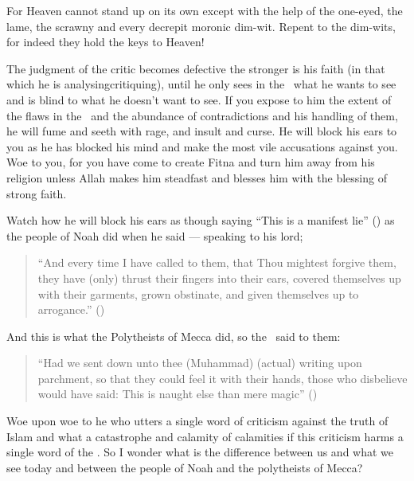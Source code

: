 \documentclass[12pt]{memoir}
\begin{document}
For Heaven cannot stand up on its own except with the help of the one-eyed,
the lame, the scrawny and every decrepit moronic dim-wit.
Repent to the dim-wits, for indeed they hold the keys to Heaven!

The judgment of the critic becomes defective the stronger is his faith
(in that which he is analysing\/critiquing),
until he only sees in the \Quran\ what he wants to see
and is blind to what he doesn’t want to see.
If you expose to him the extent of the flaws in the \Quran\
and the abundance of contradictions and his handling of them,
he will fume and seeth with rage, and insult and curse.
He will block his ears to you as he has blocked his mind
and make the most vile accusations against you.
Woe to you, for you have come to create Fitna
and turn him away from his religion unless Allah makes him
steadfast and blesses him with the blessing of strong faith.

Watch how he will block his ears as though saying “This is a manifest lie”
(\QRef{24:12}) as the people of Noah did when he said — speaking to his lord;

\begin{quote}
“And every time I have called to them, that Thou mightest forgive them,
they have (only) thrust their fingers into their ears,
covered themselves up with their garments, grown obstinate,
and given themselves up to arrogance.” ()
\end{quote}

And this is what the Polytheists of Mecca did, so the \Quran\ said to them:

\begin{quote}
“Had we sent down unto thee (Muhammad) (actual) writing upon parchment,
so that they could feel it with their hands,
those who disbelieve would have said:
This is naught else than mere magic” ()
\end{quote}

Woe upon woe to he who utters a single word of criticism against
the truth of Islam and what a catastrophe and calamity of calamities
if this criticism harms a single word of the \Quran.
So I wonder what is the difference between us and what we see today
and between the people of Noah and the polytheists of Mecca?\fnmark
\end{document}
